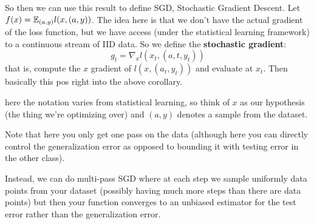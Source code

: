 \documentclass[12pt]{article}
\begin{document}
So then we can use this result to define SGD, Stochastic Gradient Descent. Let $f(x)=\mathbb{E}_{(a,y)}l(x,(a,y))$.
The idea here is that we don't have the actual gradient of the loss function, but we have access (under the statistical learning framework) to a continuous stream of IID data.
So we define the \textbf{stochastic gradient}:
\[g_t=\nabla_x l(x_t,(a,t,y_t))\]
that is, compute the $x$ gradient of $l(x,(a_t,y_t))$ and evaluate at $x_t$. Then basically this pos right into the above corollary.

\begin{rmk}
	here the notation varies from statistical learning, so think of $x$ as our hypothesis (the thing we're optimizing over) and $(a,y)$ denotes a sample from the dataset.
\end{rmk}

Note that here you only get one pass on the data (although here you can directly control the generalization error as opposed to bounding it with testing error in the other class).

Instead, we can do multi-pass SGD where at each step we sample uniformly data points from your dataset (possibly having much more steps than there are data points) but then your function converges to an unbiased estimator for the test error rather than the generalization error.
\end{document}
